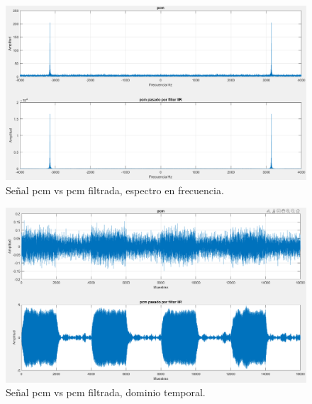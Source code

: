 \documentclass[letterpaper,onecolumn,10pt,journal,final]{IEEEtran}
\begin{document}
    \begin{figure}[H]
        \centering
        \includegraphics[width=0.75 \linewidth]{Figuras/I_4)_IIR_amplitud.png}
        \caption{Señal pcm vs pcm filtrada, espectro en frecuencia.}
        \label{fig:I4_Espectro}
    \end{figure}
    
    \begin{figure}[H]
        \centering
        \includegraphics[width=0.75 \linewidth]{Figuras/I_4)_IIR_temproal.png}
        \caption{Señal pcm vs pcm filtrada, dominio temporal.}
        \label{fig:I4_Temporal}
    \end{figure}

%
%
\end{document}
